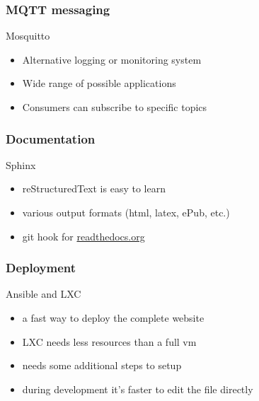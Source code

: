 %
\begin{frame}
\frametitle{MQTT messaging}
%
\begin{center}
{\Large Mosquitto}
\end{center}
\vspace{1cm}
%
\begin{itemize}
  \item Alternative logging or monitoring system
  \item Wide range of possible applications
  \item Consumers can subscribe to specific topics
\end{itemize}
\end{frame}
%
\begin{frame}
\frametitle{Documentation}
%
\begin{center}
{\Large Sphinx}
\end{center}
\vspace{1cm}
%
\begin{itemize}
  \item reStructuredText is easy to learn
  \item various output formats (html, latex, ePub, etc.)
  \item git hook for \href{https://readthedocs.org/}{readthedocs.org}
\end{itemize}
\end{frame}
%
\begin{frame}
\frametitle{Deployment}
%
\begin{center}
{\Large Ansible and LXC}
\end{center}
\vspace{1cm}
%
\begin{itemize}
  \item a fast way to deploy the complete website
  \item LXC needs less resources than a full vm
  \item needs some additional steps to setup
  \item during development it's faster to edit the file directly
\end{itemize}
\end{frame}
